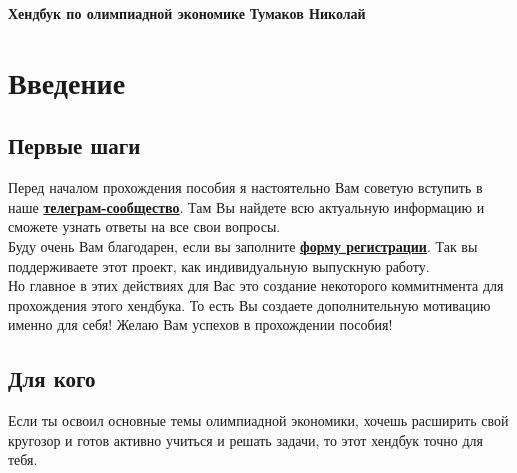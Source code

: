 






\thispagestyle{plain}
\begin{titlepage}
    \hfill\begin{center}
        \begin{tcolorbox}[
            collower=\mycolor{\mycolorlower},
            colupper=\mycolor{\mycolorupper},
            colframe=\mycolor{\mycolorframe},
            colback=\mycolor{\mycolorback},
            fonttitle=\Large\bfseries\centering,
            title=Модель Хотеллинга. Сигналинг. Вертикальная дифференциация товара
        ]
        \large\centering\textbf{Хендбук по олимпиадной экономике}
        \tcblower
        \centering\textbf{Тумаков Николай}
        \end{tcolorbox}
    \end{center}
\end{titlepage}

\restoregeometry

\tableofcontents



\chapter{Введение}


\section{Первые шаги}
\indent\setlength{\parindent}{1em}Перед началом прохождения пособия я настоятельно Вам советую вступить в наше
\textbf{\href{https://t.me/econ_handbook_screening}{телеграм-сообщество}}. Там Вы найдете всю актуальную информацию и
сможете узнать ответы на все свои вопросы.\smallskip\\
\indent\setlength{\parindent}{1em}Буду очень Вам благодарен, если вы заполните \textbf{\href{https://forms.gle/bW7CD2zcdUhnbFnR7}{форму регистрации}}. Так вы поддерживаете
этот проект, как индивидуальную выпускную работу.\smallskip\\
\indent\setlength{\parindent}{1em}Но главное в этих действиях для Вас это создание некоторого коммитнмента для прохождения этого хендбука. То есть Вы создаете дополнительную мотивацию именно для себя! Желаю Вам успехов в прохождении пособия!

\section{Для кого}
\indent\setlength{\parindent}{1em}Если ты освоил основные темы олимпиадной экономики, хочешь расширить свой кругозор и готов активно учиться и решать задачи, то этот хендбук точно для тебя.

